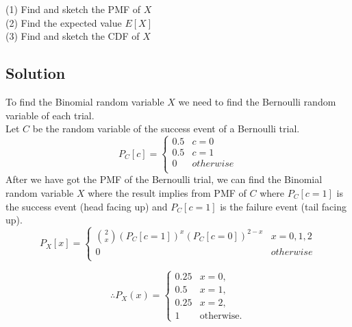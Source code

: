 \documentclass[12pt]{report} %
\begin{document}
\noindent (1) Find and sketch the PMF of $X$ \\
(2) Find the expected value $E[X]$ \\
(3) Find and sketch the CDF of $X$ \\

\subsection*{Solution}

\noindent To find the Binomial random variable $X$ we need to find
the Bernoulli random variable of each trial. \\

\noindent Let $C$ be the random variable of the success event of
a Bernoulli trial. \\
\[
P_C[c] =
\begin{cases}
    0.5 & c = 0 \\
    0.5 & c = 1 \\
    0 & otherwise \\
\end{cases}
\]
\noindent After we have got the PMF of the Bernoulli trial, we can find
the Binomial random variable $X$ where the result implies from PMF of
$C$ where $P_C[c = 1]$ is the success event (head facing up) and
$P_C[c = 1]$ is the failure event (tail facing up). \\

\[
P_X[x] =
\begin{cases}
    \binom{2}{x}(P_C[c = 1])^{x}(P_C[c = 0])^{2-x} & x = 0, 1, 2 \\
    0 & otherwise \\
\end{cases}
\]

\newpage

\begin{multicols}{2}
\[
\therefore P_X(x) =
\begin{cases}
0.25 & x = 0, \\
0.5 & x = 1, \\
0.25 & x = 2, \\
1 & \text{otherwise}.
\end{cases}
\]
\columnbreak
\\
\begin{center}
\end{center}
\end{multicols}
\end{document}
